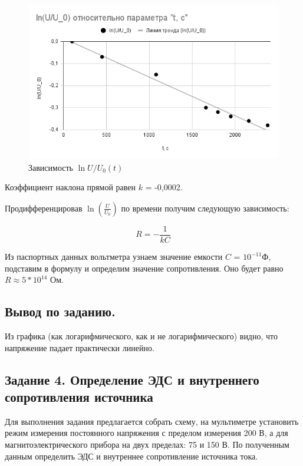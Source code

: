 \documentclass[a4paper,12pt]{article}
\begin{document}
\begin{figure}[h!]
	\begin{center}
		\includegraphics[scale=0.6]{ln.png}
	\end{center}
	\caption{Зависимость $\ln U/U_0(t)$}
\end{figure}

Коэффициент наклона прямой равен $k$ = -0,0002.

Продифференцировав $\ln(\frac{U}{U_0})$ по времени получим следующую зависимость:

\begin{equation}
    R = -\frac{1}{kC}
\end{equation}

Из паспортных данных вольтметра узнаем значение емкости $C$ = $10^{-11}$Ф, подставим
в формулу и определим значение сопротивления.
Оно будет равно $R\approx 5*10^{14}$ Ом.

\subsection{Вывод по заданию.}
\hspace{\parindent}Из графика (как логарифмического, как и не логарифмического) видно, что напряжение падает практически линейно.

\subsection{Задание 4. Определение ЭДС и внутреннего сопротивления источника}
\hspace{\parindent}Для выполнения задания предлагается собрать схему, на
мультиметре установить режим измерения постоянного напряжения с
пределом измерения 200 В, а для магнитоэлектрического прибора на двух
пределах: 75 и 150 В. По полученным данным определить ЭДС и внутреннее
сопротивление источника тока.
\end{document}
